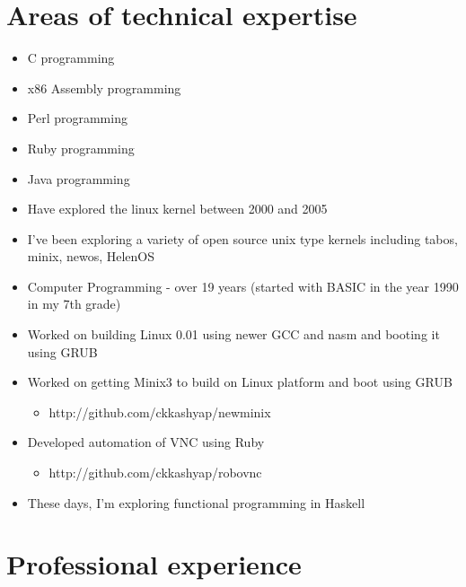 \documentclass [a4paper,11pt] {article}
\begin{document}
\section*{Areas of technical expertise}
\begin{itemize}
	\item C programming
	\item x86 Assembly programming
	\item Perl programming
	\item Ruby programming
	\item Java programming
	\item Have explored the linux kernel between 2000 and 2005
	\item I’ve been exploring a variety of open source unix type kernels including tabos, minix, newos, HelenOS
	\item Computer Programming - over 19 years (started with BASIC in the year 1990 in my 7th grade)
	\item Worked on building Linux 0.01 using newer GCC and nasm and booting it using GRUB
	\item Worked on getting Minix3 to build on Linux platform and boot using GRUB
		\begin{itemize}
			\item http://github.com/ckkashyap/newminix
		\end{itemize}
	\item Developed automation of VNC using Ruby
		\begin{itemize}
			\item http://github.com/ckkashyap/robovnc
		\end{itemize}
	\item These days, I'm exploring functional programming in Haskell
\end{itemize}


\section*{Professional experience}
\end{document}
